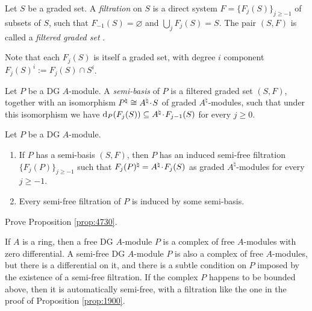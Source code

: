 \begin{dfn} \label{dfn:4731}
Let $S$ be a graded set. A {\em filtration} on $S$ is a direct system
$F = \bigl\{ F_{j}(S) \bigr\}_{j \geq -1}$
of subsets of $S$, such that 
$F_{-1}(S) = \varnothing$ and $\bigcup_{j} F_{j}(S) = S$.  
The pair $(S, F)$ is called a {\em filtered graded set}%
.
\end{dfn}

Note that each $F_{j}(S)$ is itself a graded set, with degree $i$ component
$F_{j}(S)^i := F_{j}(S) \cap S^i$.

\begin{dfn} \label{dfn:4732}
Let $P$ be a DG $A$-module. A 
{\em semi-basis}%
of $P$ is a filtered graded set 
$(S, F)$, together with an isomorphism 
$P^{\natural}  \cong A^{\natural} \mspace{1.5mu}{\cdot}\mspace{1.5mu} S$
of graded $A^{\natural}$-modules, such that under this isomorphism we have 
$\mathrm{d}_P(F_j(S)) \subseteq A^{\natural} \mspace{1.5mu}{\cdot}\mspace{1.5mu} F_{j - 1}(S)$
for every $j \geq 0$. 
\end{dfn}

\begin{prop} \label{prop:4730}
Let $P$ be a DG $A$-module. 
\begin{enumerate}
\item If $P$ has a semi-basis $(S, F)$, then $P$ has an induced semi-free 
filtration $\{ F_j(P) \}_{j \geq -1}$ such that 
$F_j(P)^{\natural} = A^{\natural} \mspace{1.5mu}{\cdot}\mspace{1.5mu} F_{j}(S)$
as graded $A^{\natural}$-modules for every $j \geq -1$.

\item Every semi-free filtration of $P$ is induced by some semi-basis. 
\end{enumerate}
\end{prop}

\begin{exer} \label{exer:4725}
Prove Proposition \ref{prop:4730}.
\end{exer}

\begin{exa} \label{exa:1575}
If $A$ is a ring, then a free DG $A$-module $P$ is a complex of free $A$-modules
with zero differential. A semi-free DG $A$-module $P$ is also a  complex of 
free $A$-modules, but there is a differential on it, and there is a subtle 
condition on $P$ imposed by the existence of a semi-free filtration. If the 
complex $P$ happens to be bounded above, then it is automatically semi-free, 
with a filtration like the one in the proof of Proposition \ref{prop:1900}. 
\end{exa}

